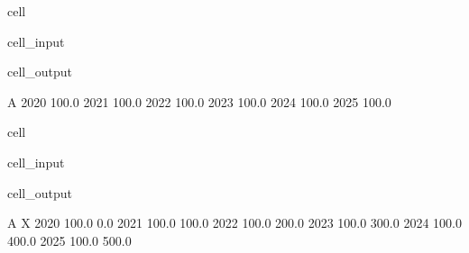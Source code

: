 \documentclass[letterpaper,10pt,english]{jupyterBook}
\begin{document}
\begin{sphinxuseclass}{cell}\begin{sphinxVerbatimInput}

\begin{sphinxuseclass}{cell_input}
\begin{sphinxVerbatim}[commandchars=\\\{\}]
\end{sphinxVerbatim}

\end{sphinxuseclass}\end{sphinxVerbatimInput}
\begin{sphinxVerbatimOutput}

\begin{sphinxuseclass}{cell_output}
\begin{sphinxVerbatim}[commandchars=\\\{\}]
          A
2020  100.0
2021  100.0
2022  100.0
2023  100.0
2024  100.0
2025  100.0
\end{sphinxVerbatim}

\end{sphinxuseclass}\end{sphinxVerbatimOutput}

\end{sphinxuseclass}
\begin{sphinxuseclass}{cell}\begin{sphinxVerbatimInput}

\begin{sphinxuseclass}{cell_input}
\begin{sphinxVerbatim}[commandchars=\\\{\}]
 
\end{sphinxVerbatim}

\end{sphinxuseclass}\end{sphinxVerbatimInput}
\begin{sphinxVerbatimOutput}

\begin{sphinxuseclass}{cell_output}
\begin{sphinxVerbatim}[commandchars=\\\{\}]
          A      X
2020  100.0    0.0
2021  100.0  100.0
2022  100.0  200.0
2023  100.0  300.0
2024  100.0  400.0
2025  100.0  500.0
\end{sphinxVerbatim}

\end{sphinxuseclass}\end{sphinxVerbatimOutput}

\end{sphinxuseclass}
\end{document}
